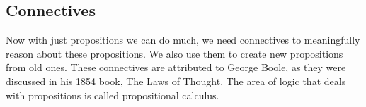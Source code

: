 \documentclass[12pt]{exam}
\begin{document}
\begin{questions}
\end{questions}

\subsection*{Connectives}
Now with just propositions we can do much, we need connectives to meaningfully reason about these propositions. We also use them to create new propositions from old ones.
These connectives are attributed to George Boole, as they were discussed in his 1854 book, The Laws of Thought. 
The area of logic that deals with propositions is called propositional calculus.
\end{document}
